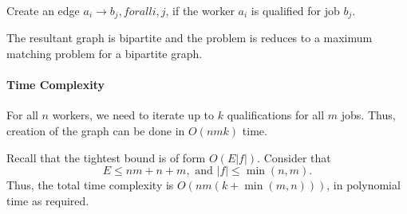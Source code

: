 Create an edge \(a_i \to  b_j, forall i, j\), if the worker \(a_i\) is
qualified for job \(b_j\). 

The resultant graph is bipartite and the problem is reduces to a
maximum matching problem for a bipartite graph.

\paragraph{Time Complexity}
For all \(n\) workers, we need to iterate up to \(k\) qualifications
for all \(m\) jobs. Thus, creation of the graph can be done in
\(O(nmk)\) time.

Recall that the tightest bound is of form \(O(E|f|)\).
Consider that \[
  E \leq nm + n + m, \text{ and } |f| \leq \min(n, m)
.\]
Thus, the total time complexity is \(O(nm(k + \min(m, n)))\),
in polynomial time as required.
